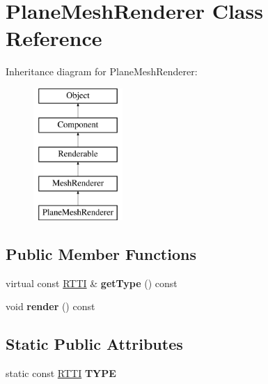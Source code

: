 \hypertarget{class_plane_mesh_renderer}{
\section{PlaneMeshRenderer Class Reference}
\label{class_plane_mesh_renderer}
}
Inheritance diagram for PlaneMeshRenderer:\begin{figure}[H]
\begin{center}
\leavevmode
\includegraphics[height=5.000000cm]{class_plane_mesh_renderer}
\end{center}
\end{figure}
\subsection*{Public Member Functions}
\begin{DoxyCompactItemize}
\item 
\hypertarget{class_plane_mesh_renderer_a9253e40492fe5d345b4d3ff809943dcc}{
virtual const \hyperlink{class_r_t_t_i}{RTTI} \& {\bfseries getType} () const }
\label{class_plane_mesh_renderer_a9253e40492fe5d345b4d3ff809943dcc}

\item 
\hypertarget{class_plane_mesh_renderer_a61d0cf9da44ea7de4ca60552edc82790}{
void {\bfseries render} () const }
\label{class_plane_mesh_renderer_a61d0cf9da44ea7de4ca60552edc82790}

\end{DoxyCompactItemize}
\subsection*{Static Public Attributes}
\begin{DoxyCompactItemize}
\item 
\hypertarget{class_plane_mesh_renderer_adaea4ffb672549bb4f152748f465ba4a}{
static const \hyperlink{class_r_t_t_i}{RTTI} {\bfseries TYPE}}
\label{class_plane_mesh_renderer_adaea4ffb672549bb4f152748f465ba4a}

\end{DoxyCompactItemize}
